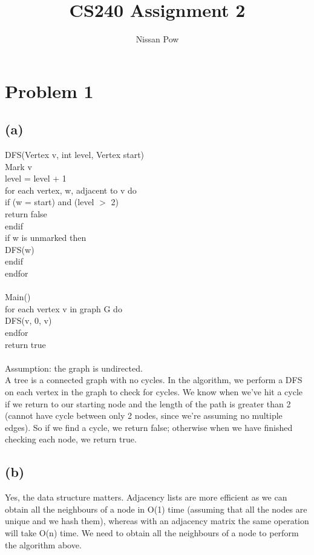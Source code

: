 \documentclass{article}[12pt]
\title{CS240 Assignment 2}
\author{Nissan Pow}
\begin{document}
\maketitle



\section*{Problem 1}
\subsection*{(a)}
\indent DFS(Vertex v, int level, Vertex start) \\
\indent \indent Mark v \\
\indent \indent level = level + 1 \\
\indent \indent for each vertex, w, adjacent to v do \\
\indent \indent \indent if (w = start) and (level $>$ 2) \\
\indent \indent \indent \indent return false \\
\indent \indent \indent endif \\
\indent \indent \indent if w is unmarked then \\
\indent \indent \indent \indent DFS(w) \\
\indent \indent \indent endif \\
\indent \indent endfor \\ \\
\indent Main() \\
\indent \indent for each vertex v in graph G do \\
\indent \indent \indent DFS(v, 0, v) \\
\indent \indent endfor \\
\indent \indent return true \\ \\

Assumption: the graph is undirected. \\
A tree is a connected graph with no cycles. In the algorithm, we perform a DFS on each vertex in the graph to check for cycles. We know when we've hit a cycle if we return to our starting node and the length of the path is greater than 2 (cannot have cycle between only 2 nodes, since we're assuming no multiple edges). So if we find a cycle, we return false; otherwise when we have finished checking each node, we return true.

\subsection*{(b)}
Yes, the data structure matters. Adjacency lists are more efficient as we can obtain all the neighbours of a node in O(1) time (assuming that all the nodes are unique and we hash them), whereas with an adjacency matrix the same operation will take O(n) time. We need to obtain all the neighbours of a node to perform the algorithm above.
\end{document}
